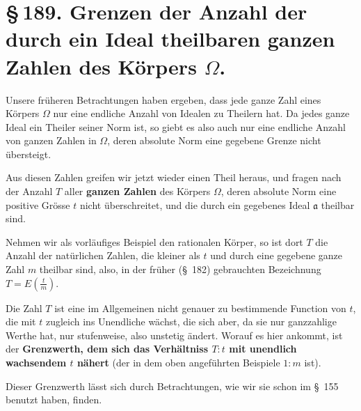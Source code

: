 \documentclass[11pt]{article}
\begin{document}
\section*{\S\,189. Grenzen der Anzahl der durch ein Ideal theilbaren ganzen Zahlen des Körpers $\Omega$.}

Unsere früheren Betrachtungen haben ergeben, dass jede ganze Zahl eines Körpers $\Omega$ nur eine endliche Anzahl von Idealen zu Theilern hat. Da jedes ganze Ideal ein Theiler seiner Norm ist, so giebt es also auch nur eine endliche Anzahl von ganzen Zahlen in $\Omega$, deren absolute Norm eine gegebene Grenze nicht übersteigt.

Aus diesen Zahlen greifen wir jetzt wieder einen Theil heraus, und fragen nach der Anzahl $T$ aller \textbf{ganzen Zahlen} des Körpers $\Omega$, deren absolute Norm eine positive Grösse $t$ nicht überschreitet, und die durch ein gegebenes Ideal $\mathfrak a$ theilbar sind.

Nehmen wir als vorläufiges Beispiel den rationalen Körper, so ist dort $T$ die Anzahl der natürlichen Zahlen, die kleiner als $t$ und durch eine gegebene ganze Zahl $m$ theilbar sind, also, in der früher (\S~182) gebrauchten Bezeichnung $T=E\left(\frac{t}{m}\right)$.

Die Zahl $T$ ist eine im Allgemeinen nicht genauer zu bestimmende Function von $t$, die mit $t$ zugleich ins Unendliche wächst, die sich aber, da sie nur ganzzahlige Werthe hat, nur stufenweise, also unstetig ändert. Worauf es hier ankommt, ist der \textbf{Grenzwerth, dem sich das Verhältniss $T:t$ mit unendlich wachsendem $t$ nähert} (der in dem oben angeführten Beispiele $1:m$ ist).

Dieser Grenzwerth lässt sich durch Betrachtungen, wie wir sie schon im \S~155 benutzt haben, finden.
\end{document}

